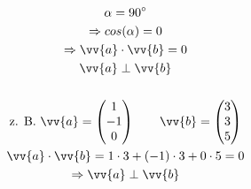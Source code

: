 \begin{gather*}
  \alpha = 90^\circ \\
  \Rightarrow cos(\alpha) = 0 \\
  \Rightarrow \vv{a} \cdot \vv{b} = 0 \\
  \vv{a} \perp \vv{b} \\\\
  \text{z. B. } \vv{a} = \begin{pmatrix}1 \\ -1 \\ 0\end{pmatrix} \qquad \vv{b} = \begin{pmatrix}3 \\ 3 \\ 5\end{pmatrix} \\
  \vv{a} \cdot \vv{b} = 1 \cdot 3 + (-1) \cdot 3 + 0 \cdot 5 = 0 \\
  \Rightarrow \vv{a} \perp \vv{b}
\end{gather*}
